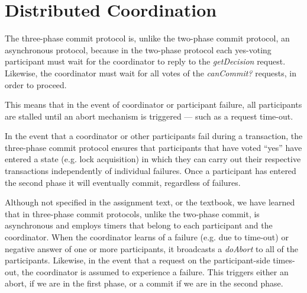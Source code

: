 
\section{Distributed Coordination}
The three-phase commit protocol is, unlike the two-phase commit protocol, an
asynchronous protocol, because in the two-phase protocol each yes-voting
participant must wait for the coordinator to reply to the {\it getDecision}
request. Likewise, the coordinator must wait for all votes of the {\it canCommit?}
requests, in order to proceed.

This means that in the event of coordinator or participant failure, all
participants are stalled until an abort mechanism is triggered --- such as a
request time-out.

In the event that a coordinator or other participants fail during a transaction,
the three-phase commit protocol ensures that participants that have voted ``yes''
have entered a state (e.g. lock acquisition) in which they can carry out their
respective transactions independently of individual failures. Once a participant
has entered the second phase it will eventually commit, regardless of failures.

Although not specified in the assignment text, or the textbook, we have learned
that in three-phase commit protocols, unlike the two-phase commit, is asynchronous
and employs timers that belong to each participant and the coordinator. When the
coordinator learns of a failure (e.g. due to time-out) or negative answer of one
or more participants, it broadcasts a {\it doAbort} to all of the participants.
Likewise, in the event that a request on the participant-side times-out, the
coordinator is assumed to experience a failure. This triggers either an abort, if
we are in the first phase, or a commit if we are in the second phase.
